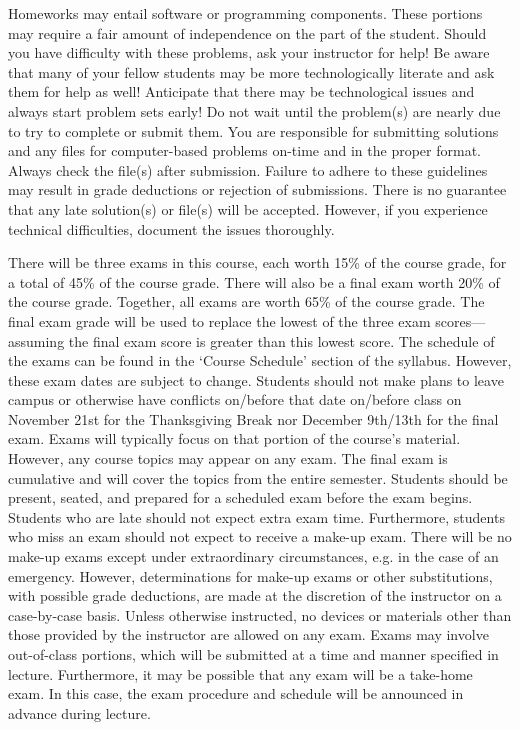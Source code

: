 \documentclass[11pt,letterpaper]{article}
\begin{document}
Homeworks may entail software or programming components. These portions may require a fair amount of independence on the part of the student. Should you have difficulty with these problems, ask your instructor for help! Be aware that many of your fellow students may be more technologically literate and ask them for help as well! Anticipate that there may be technological issues and always start problem sets early! Do not wait until the problem(s) are nearly due to try to complete or submit them. You are responsible for submitting solutions and any files for computer-based problems on-time and in the proper format. Always check the file(s) after submission. Failure to adhere to these guidelines may result in grade deductions or rejection of submissions. There is no guarantee that any late solution(s) or file(s) will be accepted. However, if you experience technical difficulties, document the issues thoroughly. 
\sectionbreak




There will be three exams in this course, each worth 15\% of the course grade, for a total of 45\% of the course grade. There will also be a final exam worth 20\% of the course grade. Together, all exams are worth 65\% of the course grade. The final exam grade will be used to replace the lowest of the three exam scores---assuming the final exam score is greater than this lowest score. The schedule of the exams can be found in the `Course Schedule' section of the syllabus. However, these exam dates are subject to change. Students should not make plans to leave campus or otherwise have conflicts on/before that date on/before class on November 21st for the Thanksgiving Break nor December 9th/13th for the final exam. Exams will typically focus on that portion of the course's material. However, any course topics may appear on any exam. The final exam is cumulative and will cover the topics from the entire semester. Students should be present, seated, and prepared for a scheduled exam before the exam begins. Students who are late should not expect extra exam time. Furthermore, students who miss an exam should not expect to receive a make-up exam. There will be no make-up exams except under extraordinary circumstances, e.g. in the case of an emergency. However, determinations for make-up exams or other substitutions, with possible grade deductions, are made at the discretion of the instructor on a case-by-case basis. Unless otherwise instructed, no devices or materials other than those provided by the instructor are allowed on any exam. Exams may involve out-of-class portions, which will be submitted at a time and manner specified in lecture. Furthermore, it may be possible that any exam will be a take-home exam. In this case, the exam procedure and schedule will be announced in advance during lecture. 
\sectionbreak
\end{document}
